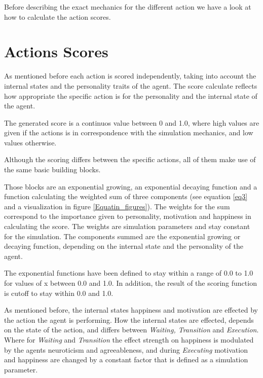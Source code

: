 Before describing the exact mechanics for the different action we have a look at
how to calculate the action scores.


\pagebreak
\label{action-scores}
\section{Actions Scores}
As mentioned before each action is scored independently, taking into account the
internal states and the personality traits of the agent. The score calculate reflects
how appropriate the specific action is for the personality and the internal state
of the agent.

The generated score is a continuos value between 0 and 1.0, where high values
are given if the actions is in correspondence with the simulation mechanics, and
low values otherwise.

Although the scoring differs between the specific actions, all of them make use
of the same basic building blocks.

\bb

Those blocks are an exponential growing, an exponential decaying function and a
function calculating the weighted sum of three components (see equation \ref{eq3}
and a visualization in figure \ref{Equatin_figures}). The weights for the sum correspond
to the importance given to personality, motivation and happiness in calculating the score.
The weights are simulation parameters and stay constant for the simulation. The components summed
are the exponential growing or decaying function, depending on the internal state
and the personality of the agent.

The exponential functions have been defined to stay within a range of 0.0 to 1.0
for values of x between 0.0 and 1.0. In addition, the result of the scoring function
is cutoff to stay within 0.0 and 1.0.

\bb

As mentioned before, the internal states happiness and motivation are effected by
the action the agent is performing. How the internal states are effected, depends
on the state of the action, and differs between \textit{Waiting, Transition} and \textit{Execution}.
Where for \textit{Waiting} and \textit{Transition} the effect strength on happiness is modulated
by the agents neuroticism and agreeableness, and during \textit{Executing}
motivation and happiness are changed by a constant factor that is defined as a
simulation parameter.

